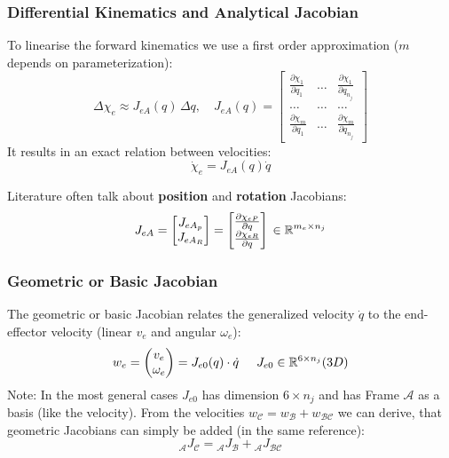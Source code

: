 \documentclass[fontsize=6pt,DIV=calc,a4paper,ngerman]{scrartcl}
\begin{document}
\begin{multicols*}{4}
	\subsubsection{Differential Kinematics and Analytical Jacobian}
	To linearise the forward kinematics we use a first order approximation ($m$ depends on parameterization):
	$$\Delta \chi_e \approx J_{eA}(q)\, \Delta q, \quad J_{eA}(q)=
		\left[\begin{smallmatrix}
				\frac{\partial \chi_1}{\partial q_1} & \dots & \frac{\partial \chi_1}{\partial q_{n_j}}\\
				\dots & \dots & \dots \\
				\frac{\partial \chi_m}{\partial q_1} & \dots  & \frac{\partial \chi_m}{\partial q_{n_j}}
			\end{smallmatrix}\right]$$
	It results in an exact relation between velocities:
	$$\dot{\chi}_e =J_{eA}(q)\dot{q}$$

	Literature often talk about \textbf{position} and \textbf{rotation} Jacobians:
	$$J_{eA} = \begin{bmatrix}
			J_{eA_p} \\ J_{eA_R}
		\end{bmatrix}
		= \begin{bmatrix}
			\frac{\partial \chi_{eP}}{\partial q} \\
			\frac{\partial \chi_{eR}}{\partial q}
		\end{bmatrix}
		\hspace{0.5mm}
		\in \mathbb{R}^{m_e \times n_j}
	$$
	\subsubsection{Geometric or Basic Jacobian}
	The geometric or basic Jacobian relates the generalized velocity $\dot{q}$ to the end-effector velocity (linear $v_e$ and angular $\omega_e$):
	$$w_e = \begin{pmatrix}v_e \\ \omega_e\end{pmatrix} = J_{e0}(q)\cdot \dot{q} \hspace{0.5cm} J_{e0} \in \mathbb{R}^{6 \times n_j} (3D)$$
	Note: In the most general cases $J_{e0}$ has dimension $6\times n_j$ and has Frame $\mathcal{A}$ as a basis (like the velocity).
	From the velocities $w_\mathcal{C} = w_\mathcal{B} + w_\mathcal{BC}$ we can derive, that geometric Jacobians can simply be added (in the same reference):
	$${}_\mathcal{A}J_\mathcal{C} = {}_\mathcal{A}J_\mathcal{B} +{}_\mathcal{A}J_\mathcal{BC}$$


\end{multicols*}
\end{document}
